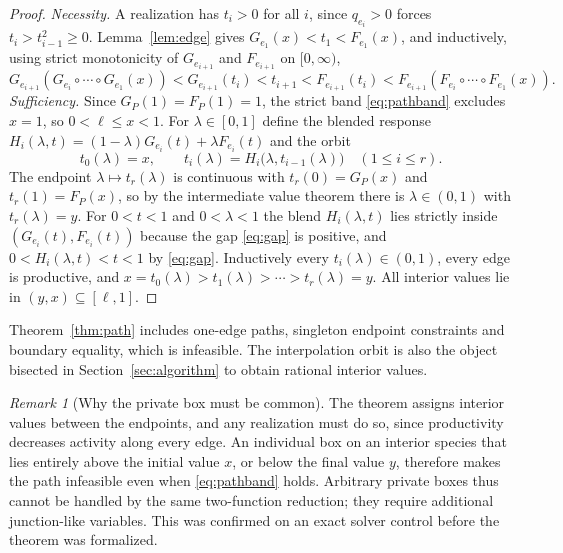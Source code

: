 \documentclass[11pt,a4paper]{article}
\theoremstyle{plain}
\theoremstyle{definition}
\theoremstyle{remark}
\newtheorem{remark}[theorem]{Remark}
\begin{document}
\begin{proof}
\emph{Necessity.} A realization has $t_i>0$ for all $i$, since $q_{e_i}>0$ forces $t_i>t_{i-1}^2\ge0$. Lemma~\ref{lem:edge} gives $G_{e_1}(x)<t_1<F_{e_1}(x)$, and inductively, using strict monotonicity of $G_{e_{i+1}}$ and $F_{e_{i+1}}$ on $[0,\infty)$,
\[
  G_{e_{i+1}}(G_{e_i}\circ\cdots\circ G_{e_1}(x))<G_{e_{i+1}}(t_i)<t_{i+1}<F_{e_{i+1}}(t_i)<F_{e_{i+1}}(F_{e_i}\circ\cdots\circ F_{e_1}(x)).
\]
\emph{Sufficiency.} Since $G_P(1)=F_P(1)=1$, the strict band \eqref{eq:pathband} excludes $x=1$, so $0<\ell\le x<1$. For $\lambda\in[0,1]$ define the blended response $H_i(\lambda,t)=(1-\lambda)G_{e_i}(t)+\lambda F_{e_i}(t)$ and the orbit
\[
  t_0(\lambda)=x,\qquad t_i(\lambda)=H_i\bigl(\lambda,t_{i-1}(\lambda)\bigr)\quad(1\le i\le r).
\]
The endpoint $\lambda\mapsto t_r(\lambda)$ is continuous with $t_r(0)=G_P(x)$ and $t_r(1)=F_P(x)$, so by the intermediate value theorem there is $\lambda\in(0,1)$ with $t_r(\lambda)=y$. For $0<t<1$ and $0<\lambda<1$ the blend $H_i(\lambda,t)$ lies strictly inside $(G_{e_i}(t),F_{e_i}(t))$ because the gap \eqref{eq:gap} is positive, and $0<H_i(\lambda,t)<t<1$ by \eqref{eq:gap}. Inductively every $t_i(\lambda)\in(0,1)$, every edge is productive, and $x=t_0(\lambda)>t_1(\lambda)>\cdots>t_r(\lambda)=y$. All interior values lie in $(y,x)\subseteq[\ell,1]$.
\end{proof}

Theorem~\ref{thm:path} includes one-edge paths, singleton endpoint constraints and boundary equality, which is infeasible. The interpolation orbit is also the object bisected in Section~\ref{sec:algorithm} to obtain rational interior values.

\begin{remark}[Why the private box must be common]\label{rem:privatebox}
The theorem assigns interior values between the endpoints, and any realization must do so, since productivity decreases activity along every edge. An individual box on an interior species that lies entirely above the initial value $x$, or below the final value $y$, therefore makes the path infeasible even when \eqref{eq:pathband} holds. Arbitrary private boxes thus cannot be handled by the same two-function reduction; they require additional junction-like variables. This was confirmed on an exact solver control before the theorem was formalized.
\end{remark}
\end{document}
